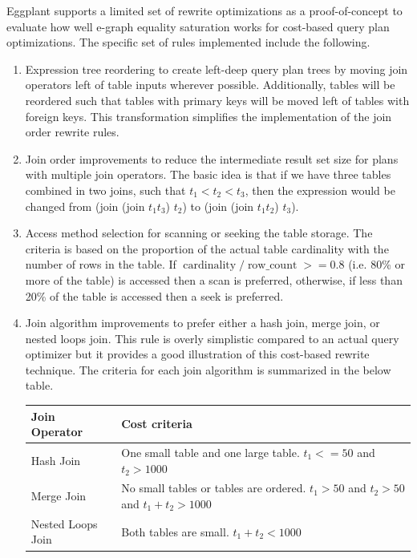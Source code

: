 \documentclass{article}
\begin{document}
Eggplant supports a limited set of rewrite optimizations as a proof-of-concept to evaluate how 
well e-graph equality saturation works for cost-based query plan optimizations.  The specific set
of rules implemented include the following.

\begin{enumerate}
\item Expression tree reordering to create left-deep query plan trees
by moving join operators left of table inputs wherever possible.  Additionally, tables will be reordered
such that tables with primary keys will be moved left of tables with foreign keys.  This 
transformation simplifies the implementation of the join order rewrite rules.

\item Join order improvements to reduce the intermediate result set size for plans with multiple
join operators.  The basic idea is that if we have three tables combined in two joins, such
that $t_1 < t_2 < t_3$, then the expression would be changed from (join (join $t_1 t_3$) $t_2$) to 
(join (join $t_1 t_2$) $t_3$).

\item Access method selection for scanning or seeking the table storage.  The criteria is based on the 
proportion of the actual table cardinality with the number of rows in the table.  If 
$\operatorname{cardinality} / \operatorname{row\_count} >= 0.8$ (i.e. 80\% or more of the table)
is accessed then a scan is preferred, otherwise, if less than 20\% of the table is accessed then
a seek is preferred.

\item Join algorithm improvements to prefer either a hash join, merge join, or nested loops join.
This rule is overly simplistic compared to an actual query optimizer but it provides a 
good illustration of this cost-based rewrite technique.  The criteria for each join algorithm
is summarized in the below table.

\begin{tabular}{ | l | l | }
\hline
\textbf{Join Operator} & \textbf{Cost criteria} \\ \hline
Hash Join & One small table and one large table.  $t_1 <= 50$ and $t_2 > 1000$\\ \hline
Merge Join & No small tables or tables are ordered. $t_1 > 50$ and $t_2 > 50$ and $t_1 + t_2 > 1000$ \\ \hline
Nested Loops Join & Both tables are small. $t_1 + t_2 < 1000$  \\ \hline
\end{tabular}
\end{enumerate}
\end{document}
